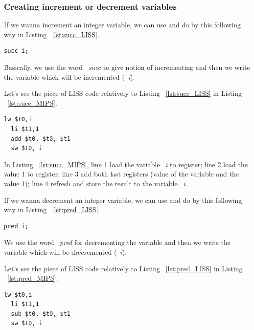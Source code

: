 \documentclass[
  oneside,
  11pt, a4paper,
  footinclude=true,
  headinclude=true,
  cleardoublepage=empty
]{scrbook}
\begin{document}
\subsubsection{Creating increment or decrement variables}

If we wanna increment an integer variable, we can use and do by this following way in Listing ~\ref{lst:succ_LISS}.

\begin{lstlisting}[caption={Increment variable in LISS},label={lst:succ_LISS}]
  succ i;
\end{lstlisting}

Basically, we use the word ~\textit{succ} to give notion of incrementing and then we write the variable which will be incremented (~\textit{i}).

Let's see the piece of LISS code relatively to Listing ~\ref{lst:succ_LISS} in Listing ~\ref{lst:succ_MIPS}.

\begin{lstlisting}[caption={Code generated for the LISS code in Listing ~\ref{lst:succ_LISS}},label={lst:succ_MIPS}]
  lw $t0,i		
  li $t1,1		
  add $t0, $t0, $t1	
  sw $t0, i		
\end{lstlisting}

In Listing ~\ref{lst:succ_MIPS}, line 1 load the variable ~\textit{i} to register; line 2 load the value 1 to register; line 3 add both last registers (value of the variable and the value 1); line 4 refresh and store the result to the variable ~\textit{i}.

If we wanna decrement an integer variable, we can use and do by this following way in Listing ~\ref{lst:pred_LISS}.

\begin{lstlisting}[caption={Decrement variable in LISS},label={lst:pred_LISS}]
  pred i;
\end{lstlisting}

We use the word ~\textit{pred} for decrementing the variable and then we write the variable which will be drecremented (~\textit{i}).

Let's see the piece of LISS code relatively to Listing ~\ref{lst:pred_LISS} in Listing ~\ref{lst:pred_MIPS}.

\begin{lstlisting}[caption={Code generated for the LISS code in Listing ~\ref{lst:pred_MIPS}},label={lst:pred_MIPS}] 
  lw $t0,i		
  li $t1,1		
  sub $t0, $t0, $t1	
  sw $t0, i		
\end{lstlisting}
\end{document}
